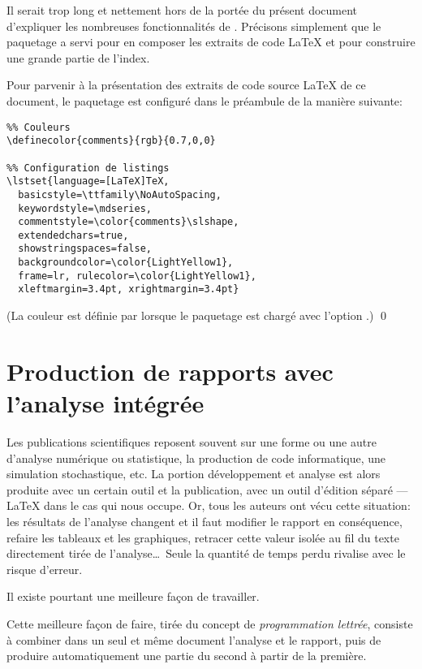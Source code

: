 Il serait trop long et nettement hors de la portée du présent document
d'expliquer les nombreuses fonctionnalités de .
Précisons simplement que le paquetage a servi pour en composer les
extraits de code {\LaTeX} et pour construire une grande partie de
l'index.

\begin{exemple}
  \label{ex:trucs:listings}
  Pour parvenir à la présentation des extraits de code source {\LaTeX}
  de ce document, le paquetage  est configuré dans le
  préambule de la manière suivante:
\begin{lstlisting}
%% Couleurs
\definecolor{comments}{rgb}{0.7,0,0}

%% Configuration de listings
\lstset{language=[LaTeX]TeX,
  basicstyle=\ttfamily\NoAutoSpacing,
  keywordstyle=\mdseries,
  commentstyle=\color{comments}\slshape,
  extendedchars=true,
  showstringspaces=false,
  backgroundcolor=\color{LightYellow1},
  frame=lr, rulecolor=\color{LightYellow1},
  xleftmargin=3.4pt, xrightmargin=3.4pt}
\end{lstlisting}
  (La couleur  est définie par  lorsque
  le paquetage est chargé avec l'option .)
  \qed
\end{exemple}



\section{Production de rapports avec l'analyse intégrée}
\label{sec:trucs:sweave}

Les publications scientifiques reposent souvent sur une forme ou une
autre d'analyse numérique ou statistique, la production de code
informatique, une simulation stochastique, etc. La portion
développement et analyse est alors produite avec un certain outil
et la publication, avec un outil d'édition séparé --- {\LaTeX} dans le cas
qui nous occupe. Or, tous les auteurs ont vécu cette situation: les
résultats de l'analyse changent et il faut modifier le rapport en
conséquence, refaire les tableaux et les graphiques, retracer cette
valeur isolée au fil du texte directement tirée de l'analyse\dots\
Seule la quantité de temps perdu rivalise avec le risque d'erreur.

Il existe pourtant une meilleure façon de travailler.

Cette meilleure façon de faire, tirée du concept de
\emph{programmation lettrée}, consiste à combiner dans un seul et même
document l'analyse et le rapport, puis de produire automatiquement une
partie du second à partir de la première.

